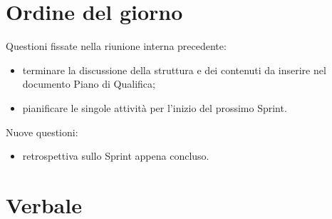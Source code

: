 \documentclass[12pt]{article}
\begin{document}
    \section{Ordine del giorno}
        Questioni fissate nella riunione interna precedente:
    	\begin{itemize}
    		\item terminare la discussione della struttura e dei contenuti da inserire nel documento Piano di Qualifica;
			\item pianificare le singole attività per l'inizio del prossimo Sprint.
    	\end{itemize}
    	Nuove questioni:
    	\begin{itemize}
    		\item retrospettiva sullo Sprint appena concluso.
    	\end{itemize}
    
    \section{Verbale}
\end{document}
